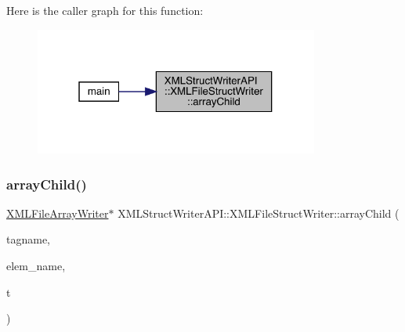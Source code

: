 Here is the caller graph for this function\+:\nopagebreak
\begin{figure}[H]
\begin{center}
\leavevmode
\includegraphics[width=265pt]{db/de3/classXMLStructWriterAPI_1_1XMLFileStructWriter_a45906f3eaab392974dde2da7cf1fef05_icgraph}
\end{center}
\end{figure}
\mbox{\label{classXMLStructWriterAPI_1_1XMLFileStructWriter_a45906f3eaab392974dde2da7cf1fef05}} 
\subsubsection{\texorpdfstring{arrayChild()}{arrayChild()}\hspace{0.1cm}{\footnotesize\ttfamily [2/2]}}
{\footnotesize\ttfamily \mbox{\hyperlink{classXMLStructWriterAPI_1_1XMLFileArrayWriter}{X\+M\+L\+File\+Array\+Writer}}$\ast$ X\+M\+L\+Struct\+Writer\+A\+P\+I\+::\+X\+M\+L\+File\+Struct\+Writer\+::array\+Child (\begin{DoxyParamCaption}\item[{const std\+::string \&}]{tagname,  }\item[{const std\+::string \&}]{elem\+\_\+name,  }\item[{\mbox{\hyperlink{namespaceXMLStructWriterAPI_a2017208be87c77a32bdc19ea2f14d032}{Array\+Type}}}]{t }\end{DoxyParamCaption})}

\mbox{\label{classXMLStructWriterAPI_1_1XMLFileStructWriter_a29ff0f4353991294bab0c75ab8895f73}} 
